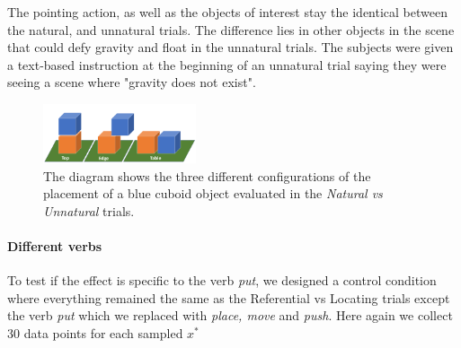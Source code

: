 The pointing action, as well as the objects of interest stay the identical between the natural, and unnatural trials. The difference lies in other objects in the scene that could defy gravity and float in the unnatural trials. The subjects were given a text-based instruction at the beginning of an unnatural trial saying they were seeing a scene where "gravity does not exist". 

\begin{figure}[H]
    \centering
    \includegraphics[width=0.4\textwidth, trim={0 0 0 0.7in},clip ] {figures/topedgetable.png}
    \vspace{-0.1in}
    \caption{
    The diagram shows the three different configurations of the placement of a blue cuboid object evaluated in the \textit{Natural vs Unnatural} trials. 
    }
    \label{fig:topedgetable}
    \vspace{-0.1in}
\end{figure}

\paragraph{Different verbs}  
To test if the effect is specific to the verb \textit{put}, we designed a control condition where everything remained the same as the Referential vs Locating trials except the verb \textit{put} which we replaced with \textit{place, move} and \textit{push}. Here again we collect 30 data points for each sampled $x^*$

